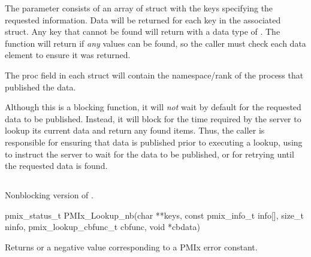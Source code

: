 The  parameter consists of an array of  struct with the keys specifying the requested information.
Data will be returned for each key in the associated  struct.
Any key that cannot be found will return with a data type of .
The function will return  if \emph{any} values can be found, so the caller must check each data element to ensure it was returned.

The proc field in each  struct will contain the namespace/rank of the process that published the data.

\adviceuserstart
Although this is a blocking function, it will \emph{not} wait by default for the requested data to be published.
Instead, it will block for the time required by the server to lookup its current data and return any found items.
Thus, the caller is responsible for ensuring that data is published prior to executing a lookup, using  to instruct the server to wait for the data to be published, or for retrying until the requested data is found.
\adviceuserend

\subsection{}

\summary

Nonblocking version of .

\format

\cspecificstart
\begin{codepar}
pmix_status_t
PMIx_Lookup_nb(char **keys,
               const pmix_info_t info[], size_t ninfo,
               pmix_lookup_cbfunc_t cbfunc, void *cbdata)
\end{codepar}
\cspecificend

\begin{arglist}
\end{arglist}

Returns  or a negative value corresponding to a PMIx error constant.

